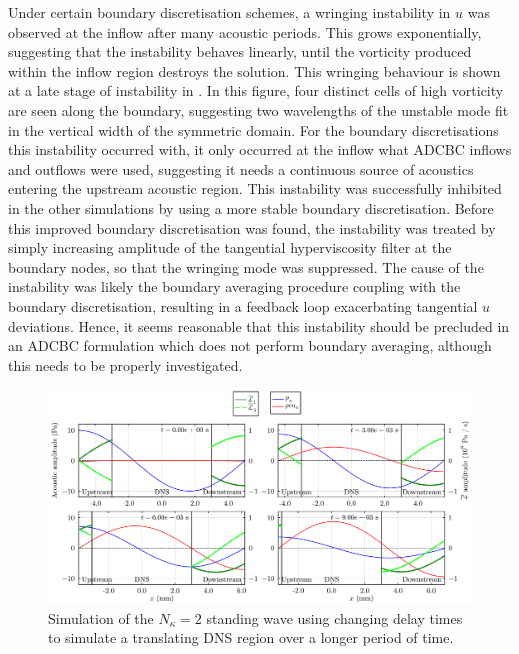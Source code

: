 Under certain boundary discretisation schemes, a wringing instability in $u$ was observed at the inflow after many acoustic periods. This grows exponentially, suggesting that the instability behaves linearly, until the vorticity produced within the inflow region destroys the solution. This wringing behaviour is shown at a late stage of instability in . In this figure, four distinct cells of high vorticity are seen along the boundary, suggesting two wavelengths of the unstable mode fit in the vertical width of the symmetric domain. For the boundary discretisations this instability occurred with, it only occurred at the inflow what ADCBC inflows and outflows were used, suggesting it needs a continuous source of acoustics entering the upstream acoustic region. This instability was successfully inhibited in the other simulations by using a more stable boundary discretisation. Before this improved boundary discretisation was found, the instability was treated by simply increasing amplitude of the tangential hyperviscosity filter at the boundary nodes, so that the wringing mode was suppressed. The cause of the instability was likely the boundary averaging procedure coupling with the boundary discretisation, resulting in a feedback loop exacerbating tangential $u$ deviations. Hence, it seems reasonable that this instability should be precluded in an ADCBC formulation which does not perform boundary averaging, although this needs to be properly investigated.

\begin{figure}[t]
\centering
\includegraphics[scale=0.33]{assets/graphs/ac-plot-3-4_moving.pdf}
\caption{Simulation of the $N_κ = 2$ standing wave using changing delay times to simulate a translating DNS region over a longer period of time.}
\label{fig:moving-dns-region}
\end{figure}

